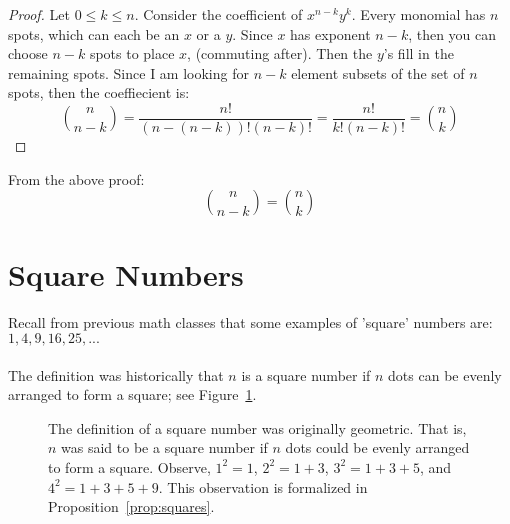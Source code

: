 \begin{proof}
Let ${0}\leq{k}\leq{n}$. Consider the coefficient of $x^{n-k}y^{k}$. Every monomial has $n$ spots, which can each be an $x$ or a $y$. Since $x$ has exponent $n-k$, then you can choose $n-k$ spots to place $x$, (commuting after). Then the $y$'s fill in the remaining spots. Since I am looking for $n-k$ element subsets of the set of $n$ spots, then the coeffiecient is: 
$$\binom{n}{n-k} = \frac{n!}{(n-(n-k))!(n-k)!} = \frac{n!}{k!(n-k)!} = \binom{n}{k}$$
\end{proof}

\begin{proposition} From the above proof:\\
$$\binom{n}{n-k} = \binom{n}{k}$$\end{proposition}

\section{Square Numbers}

Recall from previous math classes that some examples of 'square' numbers are: $1, 4, 9, 16, 25, ...$ 
\\\\The definition was historically that $n$ is a square number if $n$ dots can be evenly arranged to form a square; see Figure~\ref{fig:squares}.

\begin{figure}[!ht]
\centering
{}
\caption{The definition of a square number was originally geometric.  That is, $n$ was said to be a square number if $n$ dots could be evenly arranged to form a square.  Observe, $1^{2} = 1$, $2^{2} = 1 + 3$, $3^{2} = 1 + 3 + 5$, and $4^{2} = 1 + 3 + 5 + 9$.  This observation is formalized in Proposition~\ref{prop:squares}.}\label{fig:squares}
\end{figure}

